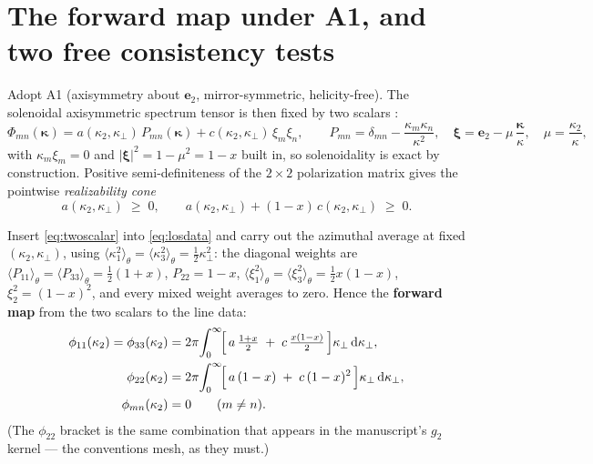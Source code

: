 \documentclass[11pt,a4paper]{article}
\newcommand{\kk}{\bm{\kappa}}
\newcommand{\kperp}{\kappa_\perp}
\newcommand{\dd}{\mathrm{d}}
\begin{document}
\section{The forward map under A1, and two free consistency tests}
\label{sec:forward}

Adopt A1 (axisymmetry about $\bm e_2$, mirror-symmetric, helicity-free). The
solenoidal axisymmetric spectrum tensor is then fixed by two scalars
\cite{Batchelor1946,Chandrasekhar1950,Lindborg1995}:
\begin{equation}
  \Phi_{mn}(\kk)
  = a(\kappa_2,\kperp)\,P_{mn}(\kk)
  + c(\kappa_2,\kperp)\,\xi_m\xi_n ,
  \qquad
  P_{mn}=\delta_{mn}-\frac{\kappa_m\kappa_n}{\kappa^2},
  \quad
  \bm\xi = \bm e_2 - \mu\,\frac{\kk}{\kappa},
  \quad \mu=\frac{\kappa_2}{\kappa},
  \label{eq:twoscalar}
\end{equation}
with $\kappa_m\xi_m=0$ and $|\bm\xi|^2 = 1-\mu^2 = 1-x$ built in, so
solenoidality is exact by construction. Positive semi-definiteness of the
$2\times2$ polarization matrix gives the pointwise \emph{realizability cone}
\begin{equation}
  a(\kappa_2,\kperp)\;\ge\;0,
  \qquad
  a(\kappa_2,\kperp) + (1-x)\,c(\kappa_2,\kperp)\;\ge\;0 .
  \label{eq:realizability}
\end{equation}

Insert \eqref{eq:twoscalar} into \eqref{eq:losdata} and carry out the
azimuthal average at fixed $(\kappa_2,\kperp)$, using
$\langle\kappa_1^2\rangle_\theta=\langle\kappa_3^2\rangle_\theta
=\tfrac12\kperp^2$: the diagonal weights are
$\langle P_{11}\rangle_\theta=\langle P_{33}\rangle_\theta=\tfrac12(1+x)$,
$P_{22}=1-x$, $\langle\xi_1^2\rangle_\theta=\langle\xi_3^2\rangle_\theta
=\tfrac12 x(1-x)$, $\xi_2^2=(1-x)^2$, and every mixed weight averages to
zero. Hence the \textbf{forward map} from the two scalars to the line data:
\begin{align}
  \phi_{11}(\kappa_2)=\phi_{33}(\kappa_2)
  &= 2\pi\!\int_0^\infty\!
     \Bigl[\,a\,\tfrac{1+x}{2} \;+\; c\,\tfrac{x(1-x)}{2}\,\Bigr]
     \kperp\,\dd\kperp ,
  \label{eq:fwd11}\\
  \phi_{22}(\kappa_2)
  &= 2\pi\!\int_0^\infty\!
     \Bigl[\,a\,(1-x) \;+\; c\,(1-x)^{2}\,\Bigr]
     \kperp\,\dd\kperp ,
  \label{eq:fwd22}\\
  \phi_{mn}(\kappa_2) &= 0 \qquad (m\ne n).
  \label{eq:fwdcross}
\end{align}
(The $\phi_{22}$ bracket is the same combination that appears in the
manuscript's $g_2$ kernel --- the conventions mesh, as they must.)
\end{document}
